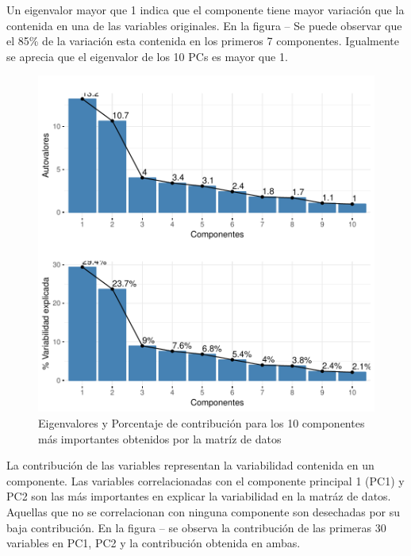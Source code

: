 \documentclass[a4paper,12pt]{Latex/Classes/PhDthesisPSnPDF}
\begin{document}
Un eigenvalor mayor que 1 indica que el componente tiene mayor variación que la contenida en una de las variables originales. En la figura -- Se puede observar que el 85\% de la variación esta contenida en los primeros 7 componentes. Igualmente se aprecia que el eigenvalor de los 10 PCs es mayor que 1. 

\begin{figure}[H]
\centering
\includegraphics{main-012}
\caption{Eigenvalores y Porcentaje de contribución para los 10 componentes más importantes obtenidos por la matríz de datos}
\end{figure}

La contribución de las variables representan la variabilidad contenida en un componente. Las variables correlacionadas con el componente principal 1 (PC1) y PC2 son las más importantes en explicar la variabilidad en la matráz de datos. Aquellas que no se correlacionan con ninguna componente son desechadas por su baja contribución. En la figura -- se observa la contribución de las primeras 30 variables en PC1, PC2 y la contribución obtenida en ambas.
\end{document}
